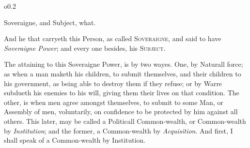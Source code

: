 \begin{wrapfigure}[4]{o}{0.2\textwidth}\raggedright Soveraigne, and
Subject, what. \end{wrapfigure}

And he that carryeth this Person, as called \textsc{Soveraigne}, and
said to have \textit{Soveraigne Power}; and every one besides, his
\textsc{Subject}.

The attaining to this Soveraigne Power, is by two wayes. One, by
Naturall force; as when a man maketh his children, to submit
themselves, and their children to his government, as being able to
destroy them if they refuse; or by Warre subdueth his enemies to his
will, giving them their lives on that condition. The other, is when
men agree amongst themselves, to submit to some Man, or Assembly of
men, voluntarily, on confidence to be protected by him against all
others. This later, may be called a Politicall Common-wealth, or
Common-wealth by \textit{Institution}; and the former, a Common-wealth
by \textit{Acquisition}. And first, I shall speak of a Common-wealth
by Institution.

